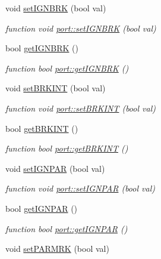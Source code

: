 \begin{DoxyCompactItemize}
\item 
void \hyperlink{classport_a407a8f3980ae8d602e74cc4d783f000c}{set\+I\+G\+N\+B\+RK} (bool val)
\begin{DoxyCompactList}\small\item\em function void \hyperlink{classport_a407a8f3980ae8d602e74cc4d783f000c}{port\+::set\+I\+G\+N\+B\+RK} (bool val) \end{DoxyCompactList}\item 
bool \hyperlink{classport_a2118bd7b0b98bacf6d4b72c1811f04e3}{get\+I\+G\+N\+B\+RK} ()
\begin{DoxyCompactList}\small\item\em function bool \hyperlink{classport_a2118bd7b0b98bacf6d4b72c1811f04e3}{port\+::get\+I\+G\+N\+B\+RK} () \end{DoxyCompactList}\item 
void \hyperlink{classport_af71e9b2220f1cd1064c3f4071e05401c}{set\+B\+R\+K\+I\+NT} (bool val)
\begin{DoxyCompactList}\small\item\em function void \hyperlink{classport_af71e9b2220f1cd1064c3f4071e05401c}{port\+::set\+B\+R\+K\+I\+NT} (bool val) \end{DoxyCompactList}\item 
bool \hyperlink{classport_adb2359f5731d74ec463766f25842f4b0}{get\+B\+R\+K\+I\+NT} ()
\begin{DoxyCompactList}\small\item\em function bool \hyperlink{classport_adb2359f5731d74ec463766f25842f4b0}{port\+::get\+B\+R\+K\+I\+NT} () \end{DoxyCompactList}\item 
void \hyperlink{classport_ae669f4e4d581ea011e42ddd2f550f8d7}{set\+I\+G\+N\+P\+AR} (bool val)
\begin{DoxyCompactList}\small\item\em function void \hyperlink{classport_ae669f4e4d581ea011e42ddd2f550f8d7}{port\+::set\+I\+G\+N\+P\+AR} (bool val) \end{DoxyCompactList}\item 
bool \hyperlink{classport_af76be254c1c7bbb23a082dd16868a2d9}{get\+I\+G\+N\+P\+AR} ()
\begin{DoxyCompactList}\small\item\em function bool \hyperlink{classport_af76be254c1c7bbb23a082dd16868a2d9}{port\+::get\+I\+G\+N\+P\+AR} () \end{DoxyCompactList}\item 
void \hyperlink{classport_a82283d6d16531d32b6a41e00b81b6c02}{set\+P\+A\+R\+M\+RK} (bool val)

\end{DoxyCompactItemize}
